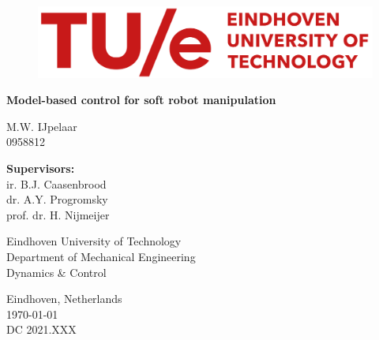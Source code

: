 
\begin{titlepage}
\vspace*{10mm}

          \begin{figure}[H]
                \centering
              \includegraphics[width=0.7\linewidth]{TitlePage/TUe-logo-descriptor-line-scarlet-L.png}
          \end{figure}

\begin{center}


\vspace*{15mm}

    \Huge
    \textbf{Model-based control for soft robot manipulation\\}
    
\vspace*{10mm}   
    \Large
    {M.W. IJpelaar} \\
    {0958812}
    
    
\vspace*{2.5cm}
\large
 \textbf{Supervisors:}   \\
    ir. B.J. Caasenbrood   \\
    dr. A.Y. Progromsky  \\
    prof. dr. H. Nijmeijer   \\

\vspace*{25mm}

\end{center}

\begin{flushleft}
Eindhoven University of Technology \\
Department of Mechanical Engineering \\
Dynamics \& Control
 
 
\vspace*{5mm} 


Eindhoven, Netherlands\\
\today \\
DC 2021.XXX
\end{flushleft}
	
	
\end{titlepage}